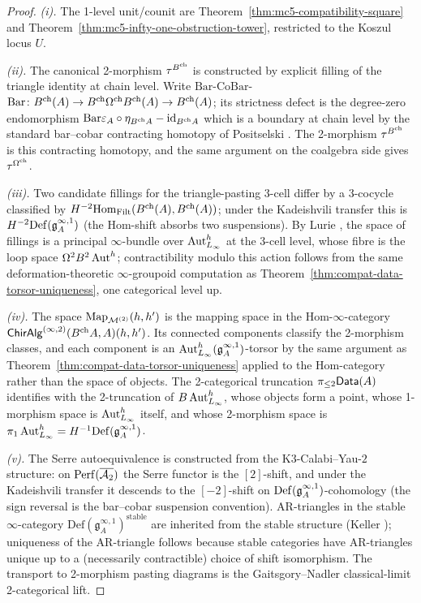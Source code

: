 \begin{proof}
\emph{(i).} The 1-level unit/counit are
Theorem~\textup{\ref{thm:mc5-compatibility-square}} and
Theorem~\textup{\ref{thm:mc5-infty-one-obstruction-tower}}, restricted
to the Koszul locus $U$.

\emph{(ii).} The canonical 2-morphism $\tau^{B^{\mathrm{ch}}}$ is constructed by
explicit filling of the triangle identity at chain level. Write
$\mathrm{Bar}$-$\mathrm{CoBar}$-$\mathrm{Bar}\colon B^{\mathrm{ch}}(A)\to B^{\mathrm{ch}}\Omega^{\mathrm{ch}}B^{\mathrm{ch}}(A)\to B^{\mathrm{ch}}(A)$;
its strictness defect is the degree-zero endomorphism
$\mathrm{Bar}\varepsilon_A\circ\eta_{B^{\mathrm{ch}} A}-\mathrm{id}_{B^{\mathrm{ch}} A}$
which is a boundary at chain level by the standard bar--cobar
contracting homotopy of Positselski \cite[]{Positselski2011}.
The 2-morphism $\tau^{B^{\mathrm{ch}}}$ is this contracting homotopy, and the
same argument on the coalgebra side gives $\tau^{\Omega^{\mathrm{ch}}}$.

\emph{(iii).} Two candidate fillings for the triangle-pasting 3-cell
differ by a 3-cocycle classified by
$H^{-2}\mathrm{Hom}_{\mathrm{Filt}}(B^{\mathrm{ch}}(A),B^{\mathrm{ch}}(A))$; under the
Kadeishvili transfer this is $H^{-2}\mathrm{Def}(\mathfrak{g}^{\infty,1}_A)$
(the $\mathrm{Hom}$-shift absorbs two suspensions). By Lurie
\cite[Theorem~5.5.5.2]{LurieHA}, the space of fillings is a principal
$\infty$-bundle over $\operatorname{Aut}^h_{L_\infty}$ at the 3-cell level, whose
fibre is the loop space $\Omega^2 B^2\operatorname{Aut}^h$; contractibility modulo
this action follows from the same deformation-theoretic
$\infty$-groupoid computation as
Theorem~\textup{\ref{thm:compat-data-torsor-uniqueness}}, one
categorical level up.

\emph{(iv).} The space $\mathrm{Map}_{\mathcal{M}^{(2)}}(h,h')$ is the mapping
space in the Hom-$\infty$-category
$\mathsf{ChirAlg}^{(\infty,2)}(B^{\mathrm{ch}} A,A)(h,h')$. Its connected components
classify the 2-morphism classes, and each component is an
$\operatorname{Aut}^h_{L_\infty}(\mathfrak{g}^{\infty,1}_A)$-torsor by the same
argument as Theorem~\textup{\ref{thm:compat-data-torsor-uniqueness}}
applied to the Hom-category rather than the space of objects. The
2-categorical truncation $\pi_{\le 2}\mathsf{Data}(A)$ identifies with the
2-truncation of $B\operatorname{Aut}^h_{L_\infty}$, whose objects form a point, whose
1-morphism space is $\operatorname{Aut}^h_{L_\infty}$ itself, and whose 2-morphism
space is $\pi_1\operatorname{Aut}^h_{L_\infty}=H^{-1}\mathrm{Def}(\mathfrak{g}^{\infty,1}_A)$.

\emph{(v).} The Serre autoequivalence is constructed from the
K3-Calabi--Yau-$2$ structure: on $\mathrm{Perf}(\overline{\mathcal{A}_2})$ the Serre functor
is the $[2]$-shift, and under the Kadeishvili transfer it descends to
the $[-2]$-shift on $\mathrm{Def}(\mathfrak{g}^{\infty,1}_A)$-cohomology (the
sign reversal is the bar--cobar suspension convention). AR-triangles
in the stable $\infty$-category
$\mathrm{Def}(\mathfrak{g}^{\infty,1}_A)^{\mathrm{stable}}$ are
inherited from the stable structure
(Keller \cite[]{Keller2013}); uniqueness of the AR-triangle
follows because stable categories have AR-triangles unique up to a
(necessarily contractible) choice of shift isomorphism. The transport to
2-morphism pasting diagrams is the Gaitsgory--Nadler
\cite[]{GaitsgoryNadler2009} classical-limit
2-categorical lift.
\end{proof}

